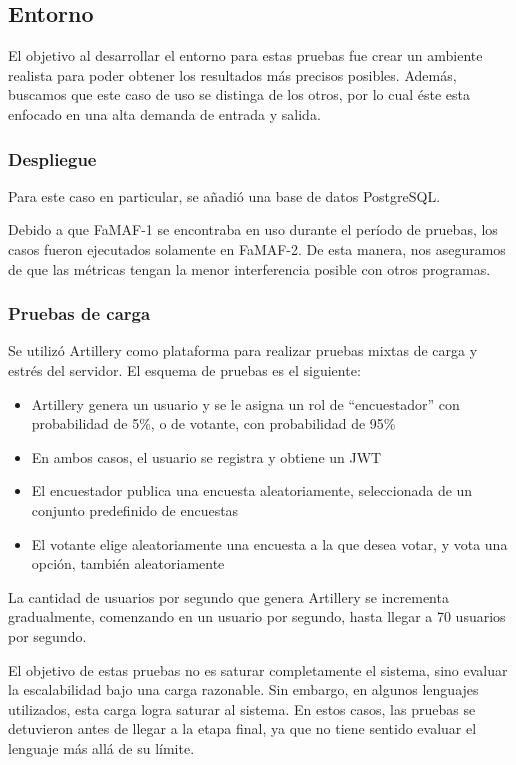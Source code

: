 \documentclass[11pt]{article}
\let\Oldsubsection\subsection
\renewcommand{\subsection}{\FloatBarrier\Oldsubsection}
\let\Oldsubsubsection\subsubsection
\renewcommand{\subsubsection}{\FloatBarrier\Oldsubsubsection}
\begin{document}
\subsection{Entorno}

El objetivo al desarrollar el entorno para estas pruebas fue crear un ambiente realista para poder obtener los resultados más precisos posibles. Además, buscamos que este caso de uso se distinga de los otros, por lo cual éste esta enfocado en una alta demanda de entrada y salida.

\subsubsection{Despliegue}

Para este caso en particular, se añadió una base de datos PostgreSQL.

Debido a que FaMAF-1 se encontraba en uso durante el período de pruebas, los casos fueron ejecutados solamente en FaMAF-2. De esta manera, nos aseguramos de que las métricas tengan la menor interferencia posible con otros programas.

\subsubsection{Pruebas de carga}

Se utilizó Artillery \cite{http:artillery} como plataforma para realizar pruebas mixtas de carga y estrés del servidor. El esquema de pruebas es el siguiente:

\begin{itemize}
    \item Artillery genera un usuario y se le asigna un rol de “encuestador” con probabilidad de 5\%, o de votante, con probabilidad de 95\%
    \item En ambos casos, el usuario se registra y obtiene un JWT
    \item El encuestador publica una encuesta aleatoriamente, seleccionada de un conjunto predefinido de encuestas
    \item El votante elige aleatoriamente una encuesta a la que desea votar, y vota una opción, también aleatoriamente
\end{itemize}

La cantidad de usuarios por segundo que genera Artillery se incrementa gradualmente, comenzando en un usuario por segundo, hasta llegar a 70 usuarios por segundo.

El objetivo de estas pruebas no es saturar completamente el sistema, sino evaluar la escalabilidad bajo una carga razonable. Sin embargo, en algunos lenguajes utilizados, esta carga logra saturar al sistema. En estos casos, las pruebas se detuvieron antes de llegar a la etapa final, ya que no tiene sentido evaluar el lenguaje más allá de su límite.
\end{document}
